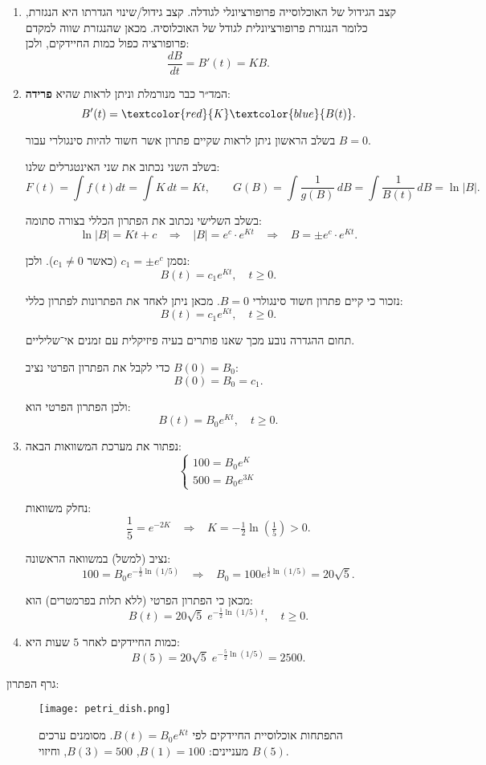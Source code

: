 \documentclass{article}
\numberwithin{equation}{section}
\begin{document}
\begin{enumerate}[label=\alph*.]
\item
קצב הגידול של האוכלוסייה פרופורציונלי לגודלה.  
קצב גידול/שינוי הגדרתו היא הנגזרת, כלומר הנגזרת פרופורציונלית לגודל של האוכלוסיה.  
מכאן שהנגזרת שווה למקדם פרופורציה כפול כמות החיידקים, ולכן:
\[
\frac{dB}{dt} = B'(t) = K B.
\]

\item
המד״ר כבר מנורמלת וניתן לראות שהיא \textbf{פרידה}:
\[
B'(t) = \textcolor{red}{K}\textcolor{blue}{ B(t)}.
\]

בשלב הראשון ניתן לראות שקיים פתרון אשר חשוד להיות סינגולרי עבור $B=0$.  

בשלב השני נכתוב את שני האינטגרלים שלנו:
\[
F(t) = \int f(t) dt = \int K\, dt = Kt,
\qquad
G(B) = \int \frac{1}{g(B)}\, dB = \int \frac{1}{B(t)}\, dB = \ln|B|.
\]

בשלב השלישי נכתוב את הפתרון הכללי בצורה סתומה:
\[
\ln|B| = Kt + c
\;\;\;\Rightarrow\;\;\;
|B| = e^c \cdot e^{Kt}
\;\;\;\Rightarrow\;\;\;
B = \pm e^c \cdot e^{Kt}.
\]

נסמן $c_1 = \pm e^c$ (כאשר $c_1 \neq 0$).  
ולכן:
\[
B(t) = c_1 e^{Kt}, \quad t \geq 0.
\]

נזכור כי קיים פתרון חשוד סינגולרי $B=0$.  
מכאן ניתן לאחד את הפתרונות לפתרון כללי:
\[
B(t) = c_1 e^{Kt}, \quad t \geq 0.
\]

תחום ההגדרה נובע מכך שאנו פותרים בעיה פיזיקלית עם זמנים אי־שליליים.

כדי לקבל את הפתרון הפרטי נציב $B(0)=B_0$:  
\[
B(0) = B_0 = c_1.
\]

ולכן הפתרון הפרטי הוא:
\[
B(t) = B_0 e^{Kt}, \quad t \geq 0.
\]

\item
נפתור את מערכת המשוואות הבאה:
\[
\begin{cases}
100 = B_0 e^K \\
500 = B_0 e^{3K}
\end{cases}
\]

נחלק משוואות:  
\[
\frac{1}{5} = e^{-2K} \;\;\;\Rightarrow\;\;\; K = -\tfrac{1}{2}\ln\left(\tfrac{1}{5}\right) > 0.
\]

נציב (למשל) במשוואה הראשונה:
\[
100 = B_0 e^{-\tfrac{1}{2}\ln(1/5)}
\;\;\;\Rightarrow\;\;\;
B_0 = 100 e^{\tfrac{1}{2}\ln(1/5)} = 20\sqrt{5}.
\]

מכאן כי הפתרון הפרטי (ללא תלות בפרמטרים) הוא:
\[
B(t) = 20\sqrt{5}\; e^{-\tfrac{1}{2}\ln(1/5)\, t}, \quad t \geq 0.
\]

\item 
כמות החיידקים לאחר $5$ שעות היא:
\[
B(5) = 20\sqrt{5}\; e^{-\tfrac{5}{2}\ln(1/5)}=2500.
\]
\end{enumerate}
גרף הפתרון:
\begin{figure}[H]
  \centering
  \texttt{[image: petri\_dish.png]}
  \caption{התפתחות אוכלוסיית החיידקים לפי $B(t) = B_0 e^{Kt}$.  
  מסומנים ערכים מעניינים: $B(1)=100$, $B(3)=500$, וחיזוי $B(5)$.}
\end{figure}
\end{document}
